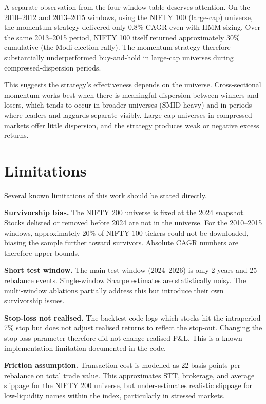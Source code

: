 \documentclass[conference]{IEEEtran}
\begin{document}
A separate observation from the four-window table deserves attention. On the 2010--2012 and 2013--2015 windows, using the NIFTY 100 (large-cap) universe, the momentum strategy delivered only 0.8\% CAGR even with HMM sizing. Over the same 2013--2015 period, NIFTY 100 itself returned approximately 30\% cumulative (the Modi election rally). The momentum strategy therefore substantially underperformed buy-and-hold in large-cap universes during compressed-dispersion periods.

This suggests the strategy's effectiveness depends on the universe. Cross-sectional momentum works best when there is meaningful dispersion between winners and losers, which tends to occur in broader universes (SMID-heavy) and in periods where leaders and laggards separate visibly. Large-cap universes in compressed markets offer little dispersion, and the strategy produces weak or negative excess returns.

\section{Limitations}
\label{sec:limitations}

Several known limitations of this work should be stated directly.

\textbf{Survivorship bias.} The NIFTY 200 universe is fixed at the 2024 snapshot. Stocks delisted or removed before 2024 are not in the universe. For the 2010--2015 windows, approximately 20\% of NIFTY 100 tickers could not be downloaded, biasing the sample further toward survivors. Absolute CAGR numbers are therefore upper bounds.

\textbf{Short test window.} The main test window (2024--2026) is only 2 years and 25 rebalance events. Single-window Sharpe estimates are statistically noisy. The multi-window ablations partially address this but introduce their own survivorship issues.

\textbf{Stop-loss not realised.} The backtest code logs which stocks hit the intraperiod 7\% stop but does not adjust realised returns to reflect the stop-out. Changing the stop-loss parameter therefore did not change realised P\&L. This is a known implementation limitation documented in the code.

\textbf{Friction assumption.} Transaction cost is modelled as 22 basis points per rebalance on total trade value. This approximates STT, brokerage, and average slippage for the NIFTY 200 universe, but under-estimates realistic slippage for low-liquidity names within the index, particularly in stressed markets.
\end{document}

